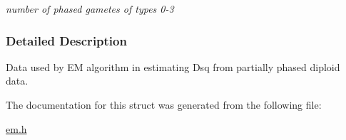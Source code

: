 \begin{DoxyCompactItemize}
\begin{DoxyCompactList}\small\item\em number of phased gametes of types 0-\/3 \end{DoxyCompactList}\end{DoxyCompactItemize}


\subsubsection{\-Detailed \-Description}
\-Data used by \-E\-M algorithm in estimating \-Dsq from partially phased diploid data. 

\-The documentation for this struct was generated from the following file\-:\begin{DoxyCompactItemize}
\item 
\hyperlink{em_8h}{em.\-h}\end{DoxyCompactItemize}
